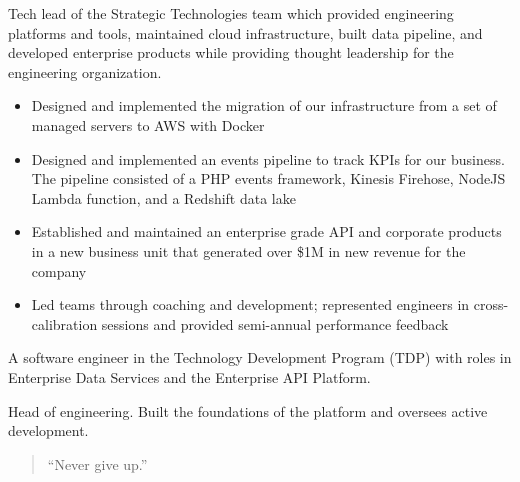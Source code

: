 \documentclass[10pt,a4paper,ragged2e,withhyper]{altacv}
\begin{document}
\begin{paracol}{2}
\divider{}

Tech lead of the Strategic Technologies team which provided engineering platforms and tools, maintained cloud infrastructure, built data pipeline, and developed enterprise products while providing thought leadership for the engineering organization.
\begin{itemize}
\item Designed and implemented the migration of our infrastructure from a set of managed servers to AWS with Docker
\item Designed and implemented an events pipeline to track KPIs for our business. The pipeline consisted of a PHP events framework, Kinesis Firehose, NodeJS Lambda function, and a Redshift data lake
\item Established and maintained an enterprise grade API and corporate products in a new business unit that generated over \$1M in new revenue for the company
\item Led teams through coaching and development; represented engineers in cross-calibration sessions and provided semi-annual performance feedback
\end{itemize}


\divider{}

A software engineer in the Technology Development Program (TDP) with roles in Enterprise Data Services and the Enterprise
API Platform.


\divider{}


Head of engineering. Built the foundations of the platform and oversees active development.


\switchcolumn

\begin{quote}
``Never give up.''
\end{quote}


\end{paracol}
\end{document}
